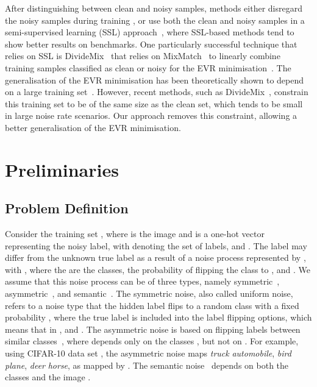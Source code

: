 \documentclass{article}
\begin{document}
After distinguishing between clean and noisy samples, methods either disregard the noisy samples during training \cite{thulasidasan2019combating, han2018co}, or use both the clean and noisy samples in a semi-supervised learning (SSL) approach~\cite{li2020dividemix, arazo2019unsupervised, sachdeva2021evidentialmix}, where SSL-based methods tend to show better results on benchmarks.
One particularly successful technique that relies on SSL is DivideMix~\cite{li2020dividemix} that relies on MixMatch~\cite{berthelot2019mixmatch} to linearly combine training samples classified as clean or noisy for the EVR minimisation~\cite{zhang2017mixup}.
The generalisation of the EVR minimisation has been theoretically shown to depend on a large training set~\cite{zhang2018generalization}.
However, recent methods, such as DivideMix~\cite{li2020dividemix}, constrain this training set to be of the same size as the clean set, which tends to be small in large noise rate scenarios. Our approach removes this constraint, allowing a better generalisation of the EVR minimisation.










\section{Preliminaries}

\subsection{Problem Definition}
\label{sec:problem_definition}


Consider the training set , where  is the  image and  is a one-hot vector representing the noisy label, with  denoting the set of labels, and . 
The label  may differ from the unknown true label  as a result of a noise process represented by , with ,
where the  are the classes,  the probability of flipping the class  to , and . We assume that this noise process can be of three types, namely symmetric~\cite{kim2019nlnl}, asymmetric~\cite{patrini2017making}, and semantic~\cite{rog}.
The symmetric noise, also called uniform noise, refers to a noise type that the hidden label flips to a random class with a fixed probability , where the true label is included into the label flipping options, which means that in , and . 
The asymmetric noise is based on flipping labels between similar classes~\cite{patrini2017making}, where  depends only on the classes , but not on . For example, using CIFAR-10 data set \cite{krizhevsky2009learning}, the asymmetric noise maps \emph{truck}  \emph{automobile}, \emph{bird}  \emph{plane}, \emph{deer}  \emph{horse}, as mapped by \cite{zhang2018generalized}. 
The semantic noise~\cite{rog} depends on both the classes  and the image .
\end{document}
